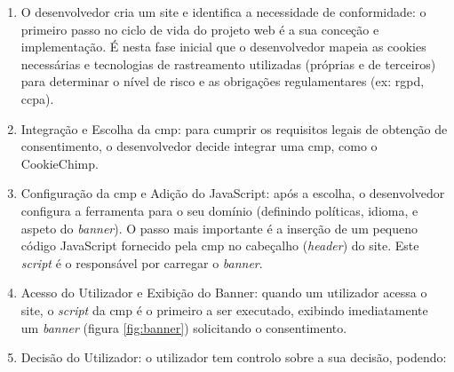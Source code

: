 \begin{enumerate}
    \item O desenvolvedor cria um site e identifica a necessidade de conformidade: o primeiro passo no ciclo de vida do projeto web é a sua conceção e implementação. É nesta fase inicial que o desenvolvedor mapeia as cookies necessárias e tecnologias de rastreamento utilizadas (próprias e de terceiros) para determinar o nível de risco e as obrigações regulamentares (ex: \acrshort{rgpd}, \acrfull{ccpa}).
    \item Integração e Escolha da \acrshort{cmp}: para cumprir os requisitos legais de obtenção de consentimento, o desenvolvedor decide integrar uma \acrshort{cmp}, como o CookieChimp.
    \item Configuração da \acrshort{cmp} e Adição do JavaScript: após a escolha, o desenvolvedor configura a ferramenta para o seu domínio (definindo políticas, idioma, e aspeto do \textit{banner}). O passo mais importante é a inserção de um pequeno código JavaScript fornecido pela \acrshort{cmp} no cabeçalho (\textit{header}) do site. Este \textit{script} é o responsável por carregar o \textit{banner}.
    \item Acesso do Utilizador e Exibição do Banner: quando um utilizador acessa o site, o \textit{script} da \acrshort{cmp} é o primeiro a ser executado, exibindo imediatamente um \textit{banner} (figura \ref{fig:banner}) solicitando o consentimento.
    \item Decisão do Utilizador: o utilizador tem controlo sobre a sua decisão, podendo:


\end{enumerate}
